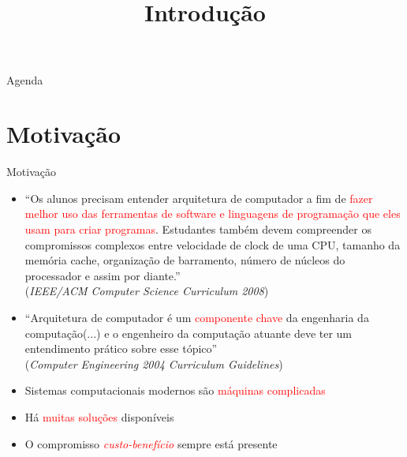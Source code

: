 



\title{\cursogrande\\ \vspace{1cm}Introdução}


   \maketitle[randomdots={false}]
   
   \begin{slide}{Agenda}
      \tableofcontents[content=sections]
   \end{slide}

\section[ slide = true]{Motivação}
\begin{slide}[toc=]{Motivação}
\begin{itemize}
	\item ``Os alunos precisam entender arquitetura de computador a fim de \textcolor{red}{fazer melhor uso das ferramentas de software e linguagens de programação que eles usam para criar programas}. Estudantes também devem compreender os compromissos complexos entre velocidade de clock de uma CPU, tamanho da memória cache, organização de barramento, número de núcleos do processador e assim por diante.''\\ {(\textit{IEEE/ACM Computer Science Curriculum 2008})}
     
  \item ``Arquitetura de computador é um \textcolor{red}{componente chave} da engenharia da computação(...) e o engenheiro da computação atuante deve ter um entendimento prático sobre esse tópico'' \\{(\textit{Computer Engineering 2004 Curriculum Guidelines})}
  \item Sistemas computacionais modernos são \textcolor{red}{máquinas complicadas}
  \item Há \textcolor{red}{muitas soluções} disponíveis
  \item O compromisso \textcolor{red}{\textit{custo-benefício}} sempre está presente
\end{itemize}
\end{slide}


